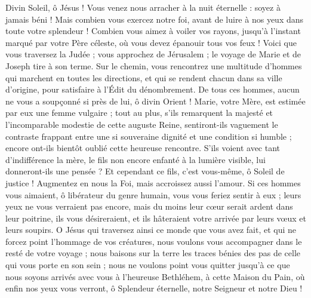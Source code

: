 \documentclass[%
fontsize=10%
,a6paper%
,DIV=15%
]{scrartcl}
\begin{document}
Divin Soleil, ô Jésus ! Vous venez nous arracher à la nuit éternelle : soyez à jamais béni ! Mais combien vous exercez notre foi, avant de luire à nos yeux dans toute votre splendeur ! Combien vous aimez à voiler vos rayons, jusqu’à l’instant marqué par votre Père céleste, où vous devez épanouir tous vos feux ! Voici que vous traversez la Judée ; vous approchez de Jérusalem ; le voyage de Marie et de Joseph tire à son terme. Sur le chemin, vous rencontrez une multitude d’hommes qui marchent en toutes les directions, et qui se rendent chacun dans sa ville d’origine, pour satisfaire à l’Édit du dénombrement. De tous ces hommes, aucun ne vous a soupçonné si près de lui, ô divin Orient ! Marie, votre Mère, est estimée par eux une femme vulgaire ; tout au plus, s’ils remarquent la majesté et l’incomparable modestie de cette auguste Reine, sentiront-ils vaguement le contraste frappant entre une si souveraine dignité et une condition si humble ; encore ont-ils bientôt oublié cette heureuse rencontre. S’ils voient avec tant d’indifférence la mère, le fils non encore enfanté à la lumière visible, lui donneront-ils une pensée ? Et cependant ce fils, c’est vous-même, ô Soleil de justice ! Augmentez en nous la Foi, mais accroissez aussi l’amour. Si ces hommes vous aimaient, ô libérateur du genre humain, vous vous feriez sentir à eux ; leurs yeux ne vous verraient pas encore, mais du moins leur cœur serait ardent dans leur poitrine, ils vous désireraient, et ils hâteraient votre arrivée par leurs vœux et leurs soupirs. O Jésus qui traversez ainsi ce monde que vous avez fait, et qui ne forcez point l’hommage de vos créatures, nous voulons vous accompagner dans le resté de votre voyage ; nous baisons sur la terre les traces bénies des pas de celle qui vous porte en son sein ; nous ne voulons point vous quitter jusqu’à ce que nous soyons arrivés avec vous à l’heureuse Bethléhem, à cette Maison du Pain, où enfin nos yeux vous verront, ô Splendeur éternelle, notre Seigneur et notre Dieu !

\end{document}
